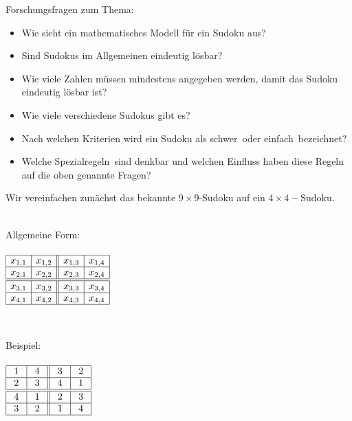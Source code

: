 Forschungsfragen zum Thema:
\begin{itemize}
\item Wie sieht ein mathematisches Modell für ein Sudoku aus?
\item Sind Sudokus im Allgemeinen eindeutig lösbar?
\item Wie viele Zahlen müssen mindestens angegeben werden, damit das Sudoku eindeutig lösbar ist?
\item Wie viele verschiedene Sudokus gibt es?
\item Nach welchen Kriterien wird ein Sudoku als \glqq schwer\grqq\ oder \glqq einfach\grqq\ bezeichnet?
\item Welche \glqq Spezialregeln\grqq\ sind denkbar und welchen Einfluss haben diese Regeln auf die oben genannte Fragen?
\end{itemize}
Wir vereinfachen zunächst das bekannte $9\times 9$-Sudoku auf ein $4\times 4 - \text{Sudoku}$.\\
\ \\
\begin{minipage}{0.4\textwidth}
\begin{center}
Allgemeine Form:\\ \ \\
\huge
$
\begin{array}{|c|c||c|c|}
\hline
x_{1,1} &  x_{1,2} & x_{1,3} & x_{1,4}\\
\hline
x_{2,1} &  x_{2,2} & x_{2,3} & x_{2,4}\\
\hline
\hline
x_{3,1} &  x_{3,2} & x_{3,3} & x_{3,4}\\
\hline
x_{4,1} &  x_{4,2} & x_{4,3} & x_{4,4}\\
\hline
\end{array}
$
\end{center}
\end{minipage}
\begin{minipage}{0.15\textwidth}
~
\end{minipage}
\begin{minipage}{0.4\textwidth}
\begin{center}
Beispiel:\\ \ \\
\huge
$
\begin{array}{|c|c||c|c|}
\hline
~1~ & ~4~ & ~3~ & ~2~\\
\hline
~2~ & ~3~ & ~4~ & ~1~\\
\hline
\hline
~4~ & ~1~ & ~2~ & ~3~\\
\hline
~3~ & ~2~ & ~1~ & ~4~\\
\hline
\end{array}
$
\end{center}
\end{minipage}
